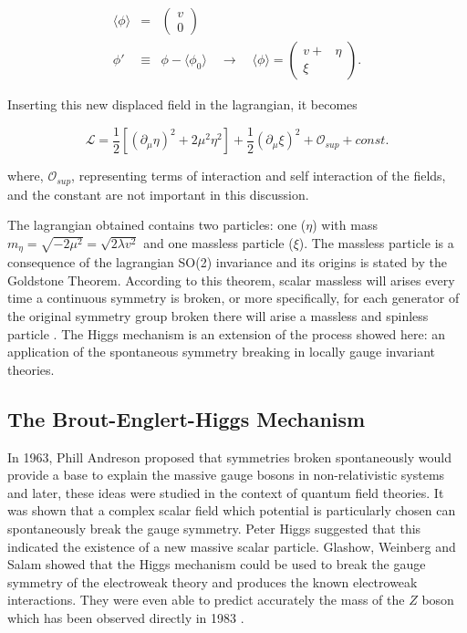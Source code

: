 \begin{eqnarray}
\langle \phi \rangle &=& \left(\begin{aligned} v \\ 0 \end{aligned} \right) \\ \phi' &\equiv& \phi - \langle \phi_0 \rangle \quad \rightarrow \quad \langle \phi \rangle = \left(\begin{aligned} v +& \eta \\ \xi& \end{aligned} \right).
\end{eqnarray}

Inserting this new displaced field in the lagrangian, it becomes

\begin{equation}
\mathcal{L} = \dfrac{1}{2}[(\partial_{\mu}\eta)^2 + 2\mu^2\eta^2] + \dfrac{1}{2}(\partial_{\mu}\xi)^2 + \mathcal{O}_{sup} + const.
\end{equation}

where, $\mathcal{O}_{sup}$, representing terms of interaction and self interaction of the fields, and the constant are not important in this discussion.

The lagrangian obtained contains two particles: one ($\eta$) with mass $m_{\eta} = \sqrt{-2\mu^2} = \sqrt{2\lambda v^2}$ and one massless particle ($\xi$). The massless particle is a consequence of the lagrangian SO(2) invariance and its origins is stated by the Goldstone Theorem. According to this theorem, scalar massless will arises every time a continuous symmetry is broken, or more specifically, for each generator of the original symmetry group broken there will arise a massless and spinless particle \cite{bib:halzen-martin-1984,bib:griffiths-2008,bib:quigg-1983}. The Higgs mechanism is an extension of the process showed here: an application of the spontaneous symmetry breaking in locally gauge invariant theories.


\subsection{The Brout-Englert-Higgs Mechanism}
In 1963, Phill Andreson proposed that symmetries broken spontaneously would provide a base to explain the massive gauge bosons in non-relativistic systems and later, these ideas were studied in the context of quantum field theories. It was shown that a complex scalar field which potential is particularly chosen can spontaneously break the gauge symmetry. Peter Higgs suggested that this indicated the existence of a new massive scalar particle. Glashow, Weinberg and Salam showed that the Higgs mechanism could be used to break the gauge symmetry of the electroweak theory and produces the known electroweak interactions. They were even able to predict accurately the mass of the $Z$ boson which has been observed directly in 1983 \cite{bib:PhysLettB-126-1983,bib:EurophysNews-14-10-1983}.

